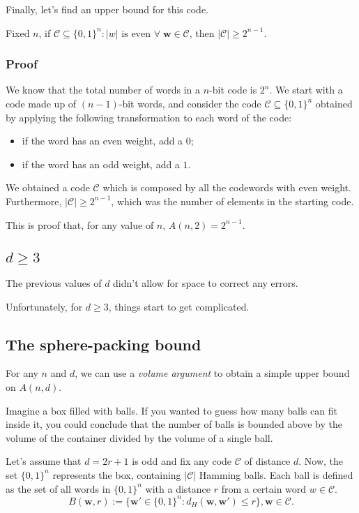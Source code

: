 Finally, let's find an upper bound for this code.
\begin{lemma}
    Fixed $n$, if $ \mathcal{C} \subseteq \{0,1\}^n : |w| \text{ is even }\forall\; \mathbf{w}\in \mathcal{C}$, then $|\mathcal{C}| \geq 2^{n-1}$.%
\end{lemma}
\subsubsection*{Proof}
We know that the total number of words in a $n$-bit code is $2^n$. We start with a code made up of $(n-1)$-bit words, and consider the code $\mathcal{C} \subseteq \{0,1\}^n$ obtained by applying the following transformation to each word of the code:
\begin{itemize}
    \item if the word has an even weight, add a $0$;
    \item if the word has an odd weight, add a $1$.
\end{itemize}

We obtained a code $\mathcal{C}$ which is composed by all the codewords with even weight. Furthermore, $|\mathcal{C}| \geq 2^{n-1}$, which was the number of elements in the starting code. %

This is proof that, for any value of $n$, $A(n,2) = 2^{n-1}$.

\subsection*{$d\geq 3$}
The previous values of $d$ didn't allow for space to correct any errors.

Unfortunately, for $d \geq 3$, things start to get complicated.

\subsection{The sphere-packing bound}

For any $n$ and $d$, we can use a \emph{volume argument} to obtain a simple upper bound on $A(n, d)$.

Imagine a box filled with balls. If you wanted to guess how many balls can fit inside it, you could conclude that the number of balls is bounded above by the volume of the container divided by the volume of a single ball.

Let's assume that $d = 2r+1$ is odd and fix any code $\mathcal{C}$ of distance $d$. Now, the set $\{0,1\}^n$ represents the box, containing $|\mathcal{C}|$ Hamming balls. Each ball is defined as the set of all words in $\{0,1\}^n$ with a distance $r$ from a certain word $w \in \mathcal{C}$.
\begin{equation}
    B(\mathbf{w}, r) := \{\mathbf{w}' \in \{0,1\}^n : d_H(\mathbf{w}, \mathbf{w}') \leq r\}, \mathbf{w} \in \mathcal{C}.
\end{equation}

